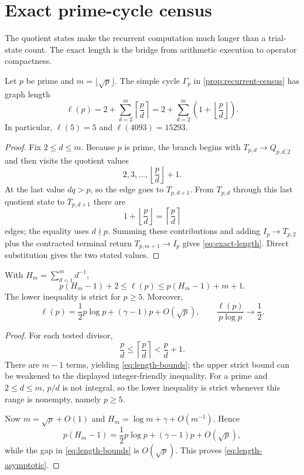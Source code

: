 \section{Exact prime-cycle census}
\label{sec:census}

The quotient states make the recurrent computation much longer than a
trial-state count.  The exact length is the bridge from arithmetic execution
to operator compactness.

\begin{theorem}
\label{thm:length}
Let $p$ be prime and $m=\lfloor\sqrt p\rfloor$.  The simple cycle
$\Gamma_p$ in \cref{prop:recurrent-census} has graph length
\begin{equation}
\boxed{
\ell(p)=2+\sum_{d=2}^{m}\left\lceil\frac pd\right\rceil
=2+\sum_{d=2}^{m}\left(1+\left\lfloor\frac pd\right\rfloor\right).}
\label{eq:exact-length}
\end{equation}
In particular, $\ell(5)=5$ and $\ell(4093)=15293$.
\end{theorem}

\begin{proof}
Fix $2\le d\le m$.  Because $p$ is prime, the branch begins with
$T_{p,d}\to Q_{p,d,2}$ and then visits the quotient values
\[
2,3,\ldots,\left\lfloor\frac pd\right\rfloor+1.
\]
At the last value $dq>p$, so the edge goes to $T_{p,d+1}$.  From
$T_{p,d}$ through this last quotient state to $T_{p,d+1}$ there are
\[
1+\left\lfloor\frac pd\right\rfloor
=\left\lceil\frac pd\right\rceil
\]
edges; the equality uses $d\nmid p$.  Summing these contributions and adding
$I_p\to T_{p,2}$ plus the contracted terminal return
$T_{p,m+1}\to I_p$ gives \eqref{eq:exact-length}.  Direct substitution gives
the two stated values.
\end{proof}

\begin{corollary}
\label{cor:length-asymptotic}
With $H_m=\sum_{d=1}^m d^{-1}$,
\begin{equation}
p(H_m-1)+2\le\ell(p)\le p(H_m-1)+m+1.
\label{eq:length-bounds}
\end{equation}
The lower inequality is strict for $p\ge5$.  Moreover,
\begin{equation}
\ell(p)=\frac12p\log p+(\gamma-1)p+O(\sqrt p),
\qquad
\frac{\ell(p)}{p\log p}\longrightarrow\frac12.
\label{eq:length-asymptotic}
\end{equation}
\end{corollary}

\begin{proof}
For each tested divisor,
\[
\frac pd\le\left\lceil\frac pd\right\rceil
<\frac pd+1.
\]
There are $m-1$ terms, yielding \eqref{eq:length-bounds}; the upper strict
bound can be weakened to the displayed integer-friendly inequality.  For a
prime and $2\le d\le m$, $p/d$ is not integral, so the lower inequality is
strict whenever this range is nonempty, namely $p\ge5$.

Now $m=\sqrt p+O(1)$ and
$H_m=\log m+\gamma+O(m^{-1})$.  Hence
\[
p(H_m-1)
=\frac12p\log p+(\gamma-1)p+O(\sqrt p),
\]
while the gap in \eqref{eq:length-bounds} is $O(\sqrt p)$.  This proves
\eqref{eq:length-asymptotic}.
\end{proof}

